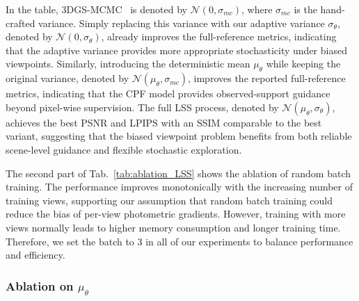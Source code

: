 \documentclass[lettersize,journal]{IEEEtran}
\begin{document}
In the table, 3DGS-MCMC~\cite{mcmc} is denoted by $\mathcal{N}(0, \sigma_{mc})$, where $\sigma_{mc}$ is the hand-crafted variance.  
Simply replacing this variance with our adaptive variance $\sigma_{\theta}$, denoted by $\mathcal{N}(0, \sigma_{\theta})$, already improves the full-reference metrics, indicating that the adaptive variance provides more appropriate stochasticity under biased viewpoints. Similarly, introducing the deterministic mean $\mu_{\theta}$ while keeping the original variance, denoted by $\mathcal{N}(\mu_{\theta}, \sigma_{mc})$, improves the reported full-reference metrics, indicating that the CPF model provides observed-support guidance beyond pixel-wise supervision.
The full LSS process, denoted by $\mathcal{N}(\mu_{\theta}, \sigma_{\theta})$, achieves the best PSNR and LPIPS with an SSIM comparable to the best variant, suggesting that the biased viewpoint problem benefits from both reliable scene-level guidance and flexible stochastic exploration.

The second part of Tab.~\ref{tab:ablation_LSS} shows the ablation of random batch training. The performance improves monotonically with the increasing number of training views, 
supporting our assumption that random batch training could reduce the bias of per-view photometric gradients.
However, training with more views normally leads to higher memory consumption and longer training time. Therefore, we set the batch to 3 in all of our experiments to balance performance and efficiency.

\subsubsection{Ablation on \texorpdfstring{$\mu_{\theta}$}{mu-theta}}
\end{document}
